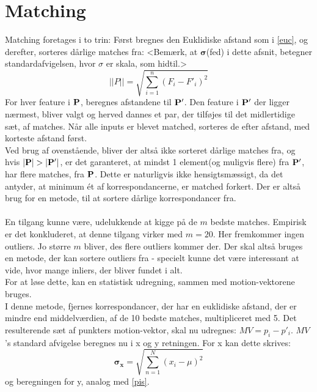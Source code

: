 \section{Matching}
Matching foretages i to trin: Først bregnes den Euklidiske afstand som i \eqref{euc}, og derefter, sorteres dårlige matches fra:
<Bemærk, at $\boldsymbol{\sigma}$(fed) i dette afsnit, betegner standardafvigelsen, hvor $\sigma$ er skala, som hidtil.>\\ 
\begin{equation}
||P|| = \sqrt{\sum\limits_{i=1}^n(F_i-F'_i)^2}
\label{euc}
\end{equation}
For hver feature i $\bold{P}$, beregnes afstandene til $\bold{P}'$. Den feature i $\bold{P}'$ der ligger nærmest, bliver valgt og herved dannes et par, der tilføjes til det midlertidige sæt, af matches. Når alle inputs er blevet matched, sorteres de efter afstand, med korteste afstand først. 
\\
Ved brug af ovenstående, bliver der altså ikke sorteret dårlige matches fra, og hvis $|\bold{P}| > |\bold{P}'|$, er det garanteret, at mindst 1 element(og muligvis flere) fra $\bold{P}'$, har flere matches, fra $\bold{P}$. Dette er naturligvis ikke hensigtsmæssigt, da det antyder, at minimum ét af korrespondancerne, er matched forkert. Der er altså brug for en metode, til at sortere dårlige korrespondancer fra.
\\
\\
En tilgang kunne være, udelukkende at kigge på de $m$ bedste matches. Empirisk er det konkluderet, at denne tilgang virker med $m=20$. Her fremkommer ingen outliers. Jo større $m$ bliver, des flere outliers kommer der. Der skal altså bruges en metode, der kan sortere outliers fra - specielt kunne det være interessant at vide, hvor mange inliers, der bliver fundet i alt.
\\
For at løse dette, kan en statistisk udregning, sammen med motion-vektorene bruges. 
\\
I denne metode, fjernes korrespondancer, der har en euklidiske afstand, der er mindre end middelværdien, af de 10 bedste matches, multipliceret med 5. Det resulterende sæt af punkters motion-vektor, skal nu udregnes: $MV = p_i - p'_i$. 
$MV$'s standard afvigelse beregnes nu i x og y retningen. For x kan dette skrives: 
\begin{equation}
\boldsymbol{\sigma_x} = \sqrt{ \sum \limits_{n=1}^N (x_i  - \mu)^2 }
\label{pis}
\end{equation}
og beregningen for y, analog med \eqref{pis}. \\

